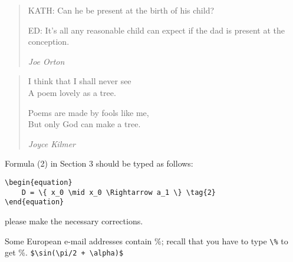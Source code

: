 \documentclass{amsart}
\begin{document}
\begin{quotation}
    KATH: Can he be present at the birth of his child?

    ED: It's all any reasonable child can expect
    if the dad is present at the conception.
    \begin{flushright}\emph{Joe Orton}\end{flushright}
\end{quotation}

\begin{verse}
    I think that I shall never see\\
    A poem lovely as a tree.

    Poems are made by fools like me,\\
    But only God can make a tree.
    \begin{flushright}
        \emph{Joyce Kilmer}
    \end{flushright}
\end{verse}

Formula (2) in Section 3 should be typed as follows:
\begin{verbatim}
\begin{equation}
    D = \{ x_0 \mid x_0 \Rightarrow a_1 \} \tag{2}
\end{equation}
\end{verbatim}
please make the necessary corrections.

Some European e-mail addresses contain \%;
recall that you have to type \verb+\%+ to get \%.
\verb*!$\sin(\pi/2 + \alpha)$!
\end{document}
